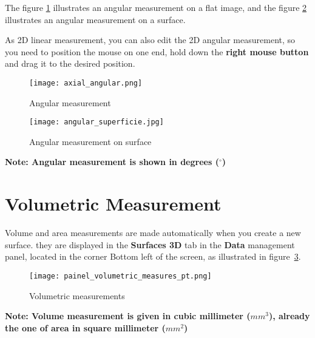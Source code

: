 
The figure \ref{fig:axial_angular} illustrates an angular measurement on a flat image, and the figure \ref{fig:axial_superficie} illustrates an angular measurement on a surface.


As 2D linear measurement, you can also edit the 2D angular measurement, so you need to position the mouse on one end, hold down the \textbf{right mouse button} and drag it to the desired position.

\begin{figure}[!htb]
\centering
\texttt{[image: axial\_angular.png]}
\caption{Angular measurement}
\label{fig:axial_angular}
\end{figure}

\begin{figure}[!htb]
\centering
\texttt{[image: angular\_superficie.jpg]}
\caption{Angular measurement on surface}
\label{fig:axial_superficie}
\end{figure}

\textbf{Note: Angular measurement is shown in degrees ($^{\circ}$)}


\section{Volumetric Measurement}


Volume and area measurements are made automatically when you create a new surface. they are displayed in the \textbf{Surfaces 3D} tab in the \textbf{Data} management panel, located in the corner
Bottom left of the screen, as illustrated in figure~\ref{fig:volumetric_mensure}.

\begin{figure}[!htb]
\centering
\texttt{[image: painel\_volumetric\_measures\_pt.png]}
\caption{Volumetric measurements}
\label{fig:volumetric_mensure}
\end{figure}

\textbf{Note: Volume measurement is given in cubic millimeter ($mm^3$), already the one of area in square millimeter ($mm^2$)}
